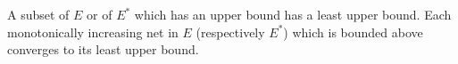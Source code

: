 A subset of $E$ or of $E^{*}$ which has an upper bound has a least upper bound. Each monotonically increasing net in $E$ (respectively $E^{*}$) which is bounded above converges to its least upper bound.
